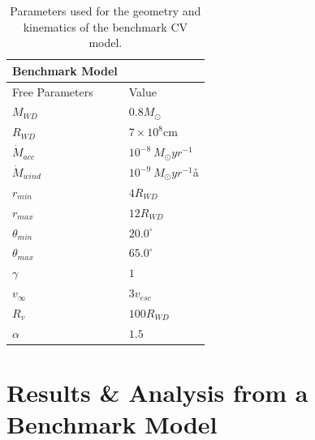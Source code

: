 \documentclass[preprint, a4paper, 11pt]{aastex}
\begin{document}
{%
%



%

%
%

\begin{table}
\centering
\begin{tabular}{p{3cm}p{4cm}}
Benchmark Model \\
\hline Free Parameters 	&	 Value \\ 
\hline \hline 
$M_{WD}$ 	 &	 $0.8 M_{\odot}$ \\ 
$R_{WD}$ 	 &	 $7\times10^{8}$cm\\ 
$\dot{M}_{acc}$ 	 &	 $10^{-8}~M_{\odot}yr^{-1}$\\ 
$\dot{M}_{wind}$  &	$10^{-9}~M_{\odot}yr^{-1}$å\\ 
$r_{min}$ 	&	 $4 R_{WD}$\\ 
$r_{max}$ 	&	 $12 R_{WD}$ \\ 
$\theta_{min}$ 	&	 $20.0^{\circ}$ \\ 
$\theta_{max}$ 	&	 $65.0^{\circ}$ \\ 
$\gamma$ 	&	 $1$ \\ 
$v_{\infty}$ 	&	 $3v_{esc}$ \\ 
$R_v$ 	        &	 $100 R_{WD}$ \\ 
$\alpha$ 	&	 $1.5$ \\
\end{tabular}
\centering
\caption{
Parameters used for the geometry and kinematics of the benchmark CV model.}
\label{wind_param}
\end{table}




\section{Results \& Analysis from a Benchmark Model}


}
\end{document}
